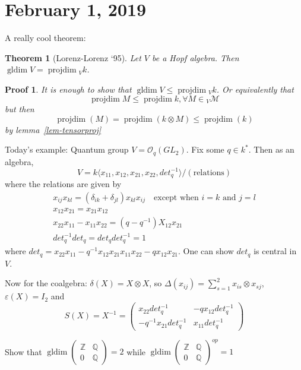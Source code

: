 \documentclass[12pt]{article}
\theoremstyle{break}
\theoremstyle{nonumberbreak}
\theoremstyle{changebreak}
\newtheorem{thm}{Theorem}[subsection]
\theoremstyle{break}
\theoremstyle{nonumberbreak}
\newtheorem{prf}{Proof}
\theoremstyle{nonumberplain}
\theoremstyle{change}
\newcommand*{\Z}{
\mathbb{Z}
}
\newcommand*{\Q}{
\mathbb{Q}
}
\DeclareMathOperator{\gldim}{gldim}
\DeclareMathOperator{\projdim}{projdim}
\newcommand*{\calM}{\mathcal{M}}
\begin{document}
\section{February 1, 2019}
A really cool theorem:
\begin{thm}[Lorenz-Lorenz `95]
	Let $V$ be a Hopf algebra. Then $\gldim V=\projdim {_Vk}$.
\end{thm}
\begin{prf}
	It is enough to show that $\gldim V\le\projdim{_Vk}$. Or equivalently that
	\[\projdim M\le \projdim k,\forall M\in{_V\calM}\]
	but then
	\[\projdim(M)=\projdim(k\otimes M)\le \projdim(k)\]
	by lemma~\ref{lem-tensorproj}
\end{prf}
\begin{ex}
	Today's example: Quantum group $V=\mathcal{O}_q(GL_2)$. Fix some $q\in k^*$. Then as an algebra, 
	\[V=k\langle x_{11},x_{12},x_{21},x_{22},det_q^{-1}\rangle/(\text{relations})\]
	where the relations are given by 
	\begin{align*}
		x_{ij}x_{kl}=(\delta_{ik}+\delta_{jl})x_{kl}x_{ij}\quad\text{except when } i=k \text{ and } j=l\\
		x_{12}x_{21}=x_{21}x_{12}\\
		x_{22}x_{11}-x_{11}x_{22}=(q-q^{-1})X_{12}x_{21}\\
		det_q^{-1}det_q=det_q det_q^{-1}=1
	\end{align*}
	where $det_q=x_{22}x_{11}-q^{-1}x_{12}x_{21}x_{11}x_{22}-qx_{12}x_{21}$. One can show $det_q$ is central in $V$.

	Now for the coalgebra: $\delta(X)=X\otimes X$, so $\Delta(x_{ij})=\sum_{s=1}^2 x_{is}\otimes x_{sj}$, $\varepsilon(X)=I_2$ and
	\[S(X)=X^{-1}=\begin{pmatrix}
		x_{22}det_q^{-1} & -qx_{12}det_q^{-1}\\
		-q^{-1}x_{21}det_q^{-1} & x_{11}det_q^{-1}
	\end{pmatrix}\]
\end{ex}
\begin{prob}
	Show that $\gldim(\begin{smallmatrix}\Z & \Q\\0 & \Q\end{smallmatrix})=2$ while $\gldim(\begin{smallmatrix}\Z & \Q\\0 & \Q\end{smallmatrix})^{op}=1$
\end{prob}
\end{document}
